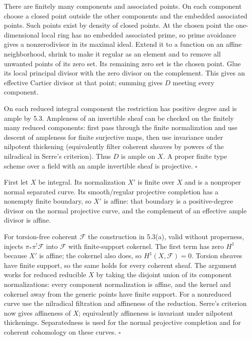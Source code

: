 \documentclass[11pt]{article}
\let\chapterexercise\exercise
\renewcommand{\exercise}[2]{\Needspace{8\baselineskip}\chapterexercise{#1}{#2}}
\begin{document}
\pf
There are finitely many components and associated points. On each component choose a closed point outside the other components and the embedded associated points. Such points exist by density of closed points. At the chosen point the one-dimensional local ring has no embedded associated prime, so prime avoidance gives a nonzerodivisor in its maximal ideal. Extend it to a function on an affine neighborhood, shrink to make it regular as an element and to remove all unwanted points of its zero set. Its remaining zero set is the chosen point. Glue its local principal divisor with the zero divisor on the complement. This gives an effective Cartier divisor at that point; summing gives $D$ meeting every component.

On each reduced integral component the restriction has positive degree and is ample by 5.3. Ampleness of an invertible sheaf can be checked on the finitely many reduced components: first pass through the finite normalization and use descent of ampleness for finite surjective maps, then use invariance under nilpotent thickening (equivalently filter coherent sheaves by powers of the nilradical in Serre's criterion). Thus $D$ is ample on $X$. A proper finite type scheme over a field with an ample invertible sheaf is projective. \hfill$\square$

\pf
First let $X$ be integral. Its normalization $X'$ is finite over $X$ and is a nonproper normal separated curve. Its smooth/regular projective completion has a nonempty finite boundary, so $X'$ is affine: that boundary is a positive-degree divisor on the normal projective curve, and the complement of an effective ample divisor is affine.

For torsion-free coherent $\mathcal F$ the construction in 5.3(a), valid without properness, injects $\pi_*\pi^!\mathcal F$ into $\mathcal F$ with finite-support cokernel. The first term has zero $H^1$ because $X'$ is affine; the cokernel also does, so $H^1(X,\mathcal F)=0$. Torsion sheaves have finite support, so the same holds for every coherent sheaf. The argument works for reduced reducible $X$ by taking the disjoint union of its component normalizations: every component normalization is affine, and the kernel and cokernel away from the generic points have finite support. For a nonreduced curve use the nilradical filtration and affineness of the reduction. Serre's criterion now gives affineness of $X$; equivalently affineness is invariant under nilpotent thickenings. Separatedness is used for the normal projective completion and for coherent cohomology on these curves. \hfill$\square$
\end{document}
